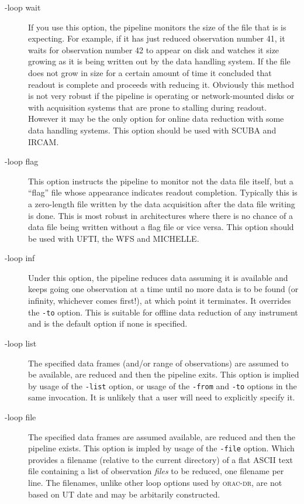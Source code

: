\documentclass[twoside,11pt]{article}
\renewcommand{\_}{\texttt{\symbol{95}}}
\newcommand{\oracdr}{\textsc{orac-dr}}
\begin{document}
\begin{description}
\item[-loop wait] \mbox{}

If you use this option, the pipeline monitors the size of the file
that is is expecting. For example, if it has just reduced observation
number 41, it waits for observation number 42 to appear on disk and
watches it size growing as it is being written out by the data
handling system. If the file does not grow in size for a certain
amount of time it concluded that readout is complete and proceeds with
reducing it. Obviously this method is not very robust if the pipeline
is operating or network-mounted disks or with acquisition systems that
are prone to stalling during readout. However it may be the only
option for online data reduction with some data handling systems. This
option should be used with SCUBA and IRCAM.

\item[-loop flag] \mbox{}

This option instructs the pipeline to monitor not the data file
itself, but a ``flag'' file whose appearance indicates readout
completion. Typically this is a zero-length file written by the data
acquisition after the data file writing is done. This is most robust
in architectures where there is no chance of a data file being written
without a flag file or vice versa. This option should be used with
UFTI, the WFS and MICHELLE.

\item[-loop inf] \mbox{}

Under this option, the pipeline reduces data assuming it is available
and keeps going one observation at a time until no more data is to be
found (or infinity, whichever comes first!), at which point it
terminates. It overrides the \texttt{-to} option. This is suitable for offline
data reduction of any instrument and is the default option if none is
specified.

\item[-loop list] \mbox{}

The specified data frames (and/or range of observations) are assumed
to be available, are reduced and then the pipeline exits. This option
is implied by usage of the \texttt{-list} option, or usage of the \texttt{-from}
and \texttt{-to} options in the same invocation. It is unlikely that a user
will need to explicitly specify it.

\item[-loop file] \mbox{}

The specified data frames are assumed available, are reduced and then
the pipeline exists. This option is impled by usage of the \texttt{-file}
option. Which provides a filename (relative to the current directory) of
a flat ASCII text file containing a list of observation \textit{files} to be 
reduced, one filename per line. The filenames, unlike other loop options
used by \oracdr, are not based on UT date and may be arbitarily constructed.

\end{description}
\end{document}
